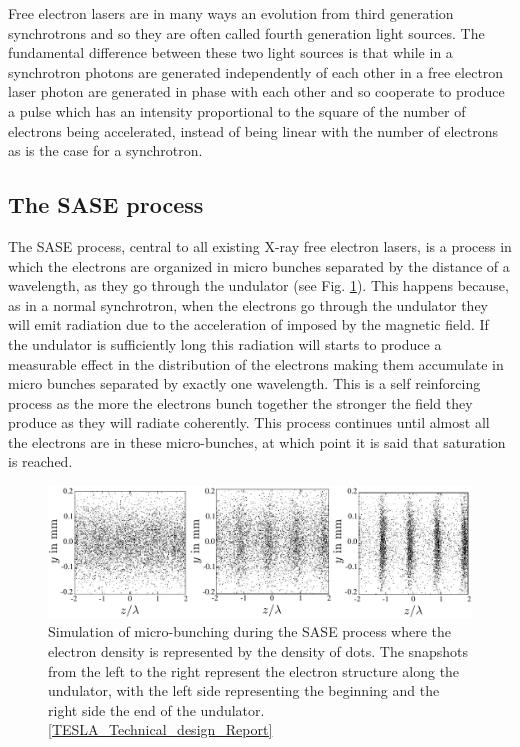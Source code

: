 Free electron lasers are in many ways an evolution from third generation
synchrotrons and so they are often called fourth generation light sources. The
fundamental difference between these two light sources is that while in a
synchrotron photons are generated independently of each other in a free electron
laser photon are generated in phase with each other and so cooperate to produce
a pulse which has an intensity proportional to the square of the number of
electrons being accelerated, instead of being linear with the number of
electrons as is the case for a synchrotron.

\subsection{The SASE process}

The SASE process, central to all existing X-ray free electron lasers, is a
process in which the electrons are organized in micro bunches separated by the
distance of a wavelength, as they go through the undulator (see
Fig. \ref{Fig:Brilliance}). This happens because,
as in a normal synchrotron, when the electrons go through the undulator they
will emit radiation due to the acceleration of imposed by the magnetic field. If
the undulator is sufficiently long this radiation will starts to produce a
measurable effect in the distribution of the electrons making them accumulate in
micro bunches separated by exactly one wavelength. This is a self reinforcing
process as the more the electrons bunch together the stronger the field they
produce as they will radiate coherently. This process continues until almost all
the electrons are in these micro-bunches, at which point it is said that
saturation is reached. 

\begin{figure}[h]
\centering
  \includegraphics[width=1.0 \columnwidth]{micro-bunching.png}
  \caption{Simulation of micro-bunching during the SASE process where the
    electron density is represented by the density of dots. The snapshots
    from the left to the right represent the electron structure along the
    undulator, with the left side representing the beginning and the right side
    the end of the undulator. \ref{TESLA_Technical_design_Report}}
  \label{Fig:Brilliance}
\end{figure}

